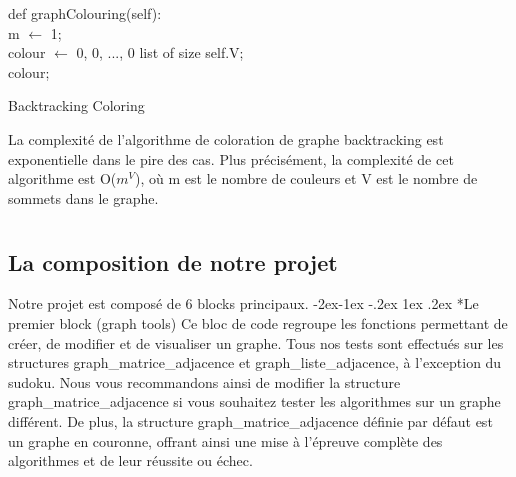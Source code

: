 \documentclass{report}
\makeatletter
\renewcommand\subsection{\@startsection{subsection}{2}{\z@}%
  {-2ex\@plus -1ex \@minus -.2ex}%
  {1ex \@plus .2ex}%
  {\normalfont\bfseries}}
\makeatother
\begin{document}
\begin{algorithm}[H]
    def graphColouring(self):\\
    \hspace{2em} m $\leftarrow$ 1;\\
    \hspace{2em} colour $\leftarrow$ {0, 0, ..., 0} list of size self.V;\\
    \hspace{2em} 
    \hspace{2em} \Return colour;\\
    \SetAlgoLined
    \SetNoFillComment
       \caption{Backtracking Coloring}

\end{algorithm}
\begin{note}
    La complexité de l'algorithme de coloration de graphe backtracking  est exponentielle dans le pire des cas. Plus précisément, la complexité de cet algorithme est O($m^V$), où m est le nombre de couleurs et V est le nombre de sommets dans le graphe.
\end {note}

\newpage
\chapter{}
\section*{La composition de notre projet }
\hspace{2em}Notre projet est composé de 6 blocks principaux.
\subsection*{Le premier block (graph tools) }
\hspace{2em} Ce bloc de code regroupe les fonctions permettant de créer, de modifier et de visualiser un graphe. Tous nos tests sont effectués sur les structures graph\_matrice\_adjacence et graph\_liste\_adjacence, à l'exception du sudoku. Nous vous recommandons ainsi de modifier la structure graph\_matrice\_adjacence si vous souhaitez tester les algorithmes sur un graphe différent. De plus, la structure graph\_matrice\_adjacence définie par défaut est un graphe en couronne, offrant ainsi une mise à l'épreuve complète des algorithmes et de leur réussite ou échec.
\end{document}
